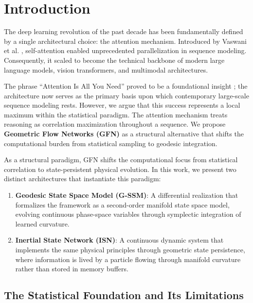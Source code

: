 \documentclass[12pt,a4paper]{article}
\begin{document}
\section{Introduction}
\label{sec:introduction}

The deep learning revolution of the past decade has been fundamentally defined by a single architectural choice: the attention mechanism. Introduced by Vaswani et al. \cite{vaswani2017}, self-attention enabled unprecedented parallelization in sequence modeling. Consequently, it scaled to become the technical backbone of modern large language models, vision transformers, and multimodal architectures.

The phrase ``Attention Is All You Need'' proved to be a foundational insight \cite{vaswani2017}; the architecture now serves as the primary basis upon which contemporary large-scale sequence modeling rests. However, we argue that this success represents a local maximum within the statistical paradigm. The attention mechanism treats reasoning as correlation maximization throughout a sequence. We propose \textbf{Geometric Flow Networks (GFN)} as a structural alternative that shifts the computational burden from statistical sampling to geodesic integration.

As a structural paradigm, GFN shifts the computational focus from statistical correlation to state-persistent physical evolution. In this work, we present two distinct architectures that instantiate this paradigm:

\begin{enumerate}
    \item \textbf{Geodesic State Space Model (G-SSM)}: A differential realization that formalizes the framework as a second-order manifold state space model, evolving continuous phase-space variables through symplectic integration of learned curvature.

    \item \textbf{Inertial State Network (ISN)}: A continuous dynamic system that implements the same physical principles through geometric state persistence, where information is lived by a particle flowing through manifold curvature rather than stored in memory buffers.
\end{enumerate}

\subsection{The Statistical Foundation and Its Limitations}
\label{sec:statistical-limitations}
\end{document}
